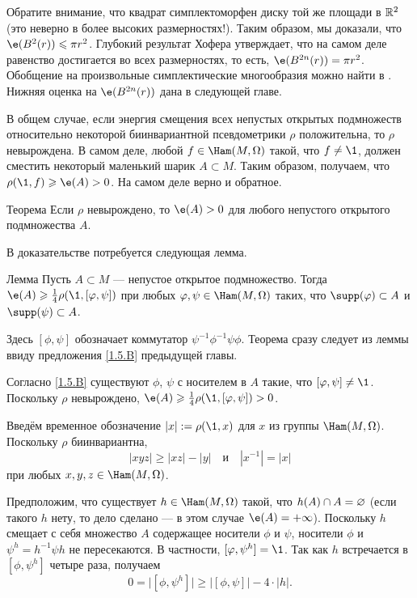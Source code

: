 Обратите внимание, что квадрат симплектоморфен диску той же площади в $\mathbb{R}^2$ (это неверно в более высоких размерностях!).
Таким образом, мы доказали, что $\e (B^2 (r)) \le \pi r^2$.
Глубокий результат Хофера \cite{H1} утверждает, что на самом деле равенство
достигается во всех размерностях, то есть, $\e (B^{2n} (r)) = \pi r^2$.
Обобщение на произвольные симплектические многообразия можно найти в \cite{LM1}.
Нижняя оценка на $\e(B^{2n} (r))$ дана в следующей главе.

В общем случае, если энергия смещения всех непустых открытых подмножеств относительно некоторой биинвариантной псевдометрики $\rho$ положительна, то $\rho$ невырождена.
В самом деле, любой $f \in \Ham (M, \Omega)$ такой, что $f \ne \1$,
должен сместить некоторый маленький шарик $A \subset M$.
Таким образом, получаем, что $\rho (\1, f) \ge \e (A)> 0$.
На самом деле верно и обратное.

\begin{thm}[(\cite{EP})]{Теорема}\label{2.4.A}
Если $\rho$ невырождено, то $\e (A)> 0$ для любого непустого открытого подмножества $A$.
\end{thm}

В доказательстве потребуется следующая лемма.

\begin{thm}{Лемма}\label{2.4.B}
Пусть $A \subset M$ — непустое открытое подмножество.
Тогда $\e (A) \ge \tfrac14 \rho (\1, [\phi, \psi])$ при любых $\phi, \psi \in \Ham (M, \Omega)$ таких, что $\supp (\phi) \subset A$ и $\supp (\psi) \subset A$.
\end{thm}

Здесь $[\phi, \psi]$ обозначает коммутатор $\psi^{-1} \phi^{-1} \psi\phi$.
Теорема сразу следует из леммы ввиду предложения \ref{1.5.B} предыдущей главы.

Согласно \ref{1.5.B} существуют $\phi$, $\psi$ с носителем в $A$ такие, что $[\phi, \psi] \ne \1$.
Поскольку $\rho$ невырождено, $\e (A) \z\ge \tfrac14 \rho (\1, [\phi, \psi])> 0$.
\qeds


Введём временное обозначение $|x|\z\df\rho(\1,x)$
для $x$ из группы $\Ham (M, \Omega)$.
Поскольку $\rho$ биинвариантна,
\[
|xyz|
\ge
|xz|-|y|
\quad\text{и}\quad
|x^{-1}|=|x|
\]
при любых $x,y,z\in \Ham (M, \Omega)$.

Предположим, что существует $h \in \Ham (M, \Omega)$ такой, что $h (A) \z\cap A \z= \emptyset$ (если такого $h$ нету, то дело сделано — в этом случае $\e (A) \z= + \infty$).
Поскольку $h$ смещает с себя множество $A$ содержащее носители $\phi$ и $\psi$,
носители $\phi$ и $\psi^{h}=h^{-1} \psi h$ не пересекаются.
В частности, $[\phi,\psi^{h}]=\1$.
Так как $h$ встречается в $[\phi,\psi^{h}]$ четыре раза, получаем
\[
0=\big|[\phi,\psi^{h}]\big|
\ge
\big|[\phi,\psi]\big| - 4\cdot|h|.
\]
\qedsf

